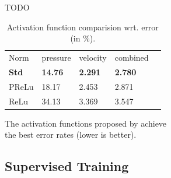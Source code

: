 \documentclass[acmtog]{techreportacmart}
\begin{document}
TODO
\begin{table}[h]
\caption{Activation function comparision wrt. error (in \%).}
\label{tab:two}
\begin{center}
\begin{tabular}{l|l|l|l|l}
  \toprule
  Norm   & pressure   &	velocity    & combined \\
  \bf Std	 & \bf 14.76	  & \bf 2.291		& \bf 2.780	   \\
  PReLu	 & 18.17	  & 2.453		& 2.871	   \\
  ReLu	 & 34.13	  & 3.369		& 3.547	   \\
  \bottomrule
\end{tabular}
\end{center}
\bigskip\centering
\footnotesize The activation functions proposed by \cite{Thuerey20} achieve \\ the best error rates (lower is better).
\end{table}%

\subsection{Supervised Training}
\end{document}
